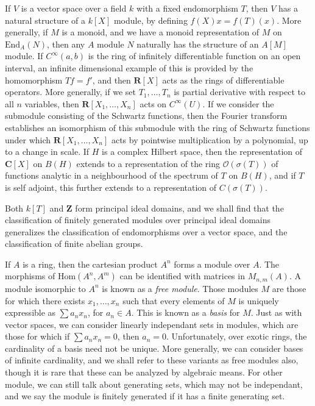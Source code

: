 \begin{example}
    If $V$ is a vector space over a field $k$ with a fixed endomorphism $T$, then $V$ has a natural structure of a $k[X]$ module, by defining $f(X) x = f(T)(x)$. More generally, if $M$ is a monoid, and we have a monoid representation of $M$ on $\text{End}_A(N)$, then any $A$ module $N$ naturally has the structure of an $A[M]$ module. If $C^\infty(a,b)$ is the ring of infinitely differentiable function on an open interval, an infinite dimensional example of this is provided by the homomorphism $Tf = f'$, and then $\mathbf{R}[X]$ acts as the rings of differentiable operators. More generally, if we set $T_1, \dots, T_n$ is partial derivative with respect to all $n$ variables, then $\mathbf{R}[X_1, \dots, X_n]$ acts on $C^\infty(U)$. If we consider the submodule consisting of the Schwartz functions, then the Fourier transform establishes an isomorphism of this submodule with the ring of Schwartz functions under which $\mathbf{R}[X_1, \dots, X_n]$ acts by pointwise multiplication by a polynomial, up to a change in scale. If $H$ is a complex Hilbert space, then the representation of $\mathbf{C}[X]$ on $B(H)$ extends to a representation of the ring $\mathcal{O}(\sigma(T))$ of functions analytic in a neighbourhood of the spectrum of $T$ on $B(H)$, and if $T$ is self adjoint, this further extends to a representation of $C(\sigma(T))$.
\end{example}

Both $k[T]$ and $\mathbf{Z}$ form principal ideal domains, and we shall find that the classification of finitely generated modules over principal ideal domains generalizes the classification of endomorphisms over a vector space, and the classification of finite abelian groups.

\begin{example}
    If $A$ is a ring, then the cartesian product $A^n$ forms a module over $A$. The morphisms of $\text{Hom}(A^n, A^m)$ can be identified with matrices in $M_{n,m}(A)$. A module isomorphic to $A^n$ is known as a \emph{free module}. Those modules $M$ are those for which there exists $x_1, \dots, x_n$ such that every elements of $M$ is uniquely expressible as $\sum a_n x_n$, for $a_n \in A$. This is known as a \emph{basis} for $M$. Just as with vector spaces, we can consider linearly independant sets in modules, which are those for which if $\sum a_n x_n = 0$, then $a_n = 0$. Unfortunately, over exotic rings, the cardinality of a basis need not be unique. More generally, we can consider bases of infinite cardinality, and we shall refer to these variants as free modules also, though it is rare that these can be analyzed by algebraic means. For other module, we can still talk about generating sets, which may not be independant, and we say the module is finitely generated if it has a finite generating set.
\end{example}

